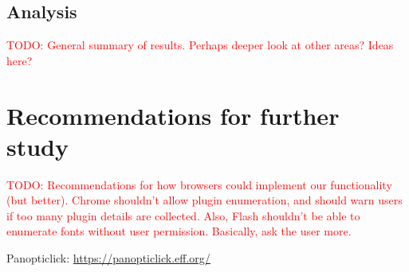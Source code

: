 \documentclass[12pt,a4paper]{article}
\begin{document}
\subsection{Analysis}
\textcolor{red}{TODO: General summary of results. Perhaps deeper look at other areas? Ideas here?}

\section{Recommendations for further study}
\textcolor{red}{TODO: Recommendations for how browsers could implement our functionality (but better). Chrome shouldn't allow plugin enumeration, and should warn users if too many plugin details are collected. Also, Flash shouldn't be able to enumerate fonts without user permission. Basically, ask the user more.}

\begin{thebibliography}{0}

  Panopticlick: \url{https://panopticlick.eff.org/}

\end{thebibliography}
\end{document}

